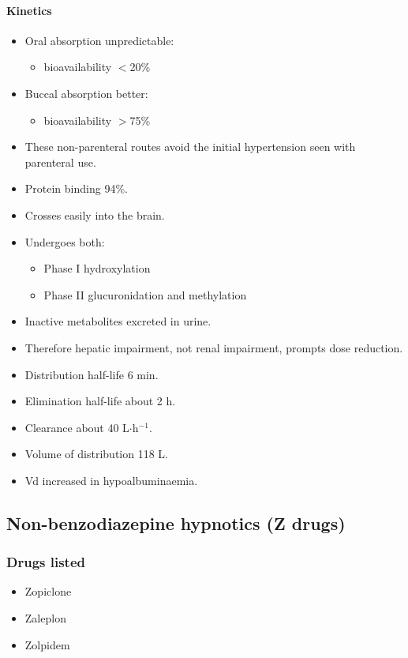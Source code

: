 \documentclass[11pt,a4paper]{article}
\begin{document}
\paragraph{Kinetics}
\begin{itemize}
  \item Oral absorption unpredictable:
  \begin{itemize}
    \item bioavailability $<$20\%
  \end{itemize}
  \item Buccal absorption better:
  \begin{itemize}
    \item bioavailability $>$75\%
  \end{itemize}
  \item These non-parenteral routes avoid the initial hypertension seen with parenteral use.
  \item Protein binding 94\%.
  \item Crosses easily into the brain.
  \item Undergoes both:
  \begin{itemize}
    \item Phase I hydroxylation
    \item Phase II glucuronidation and methylation
  \end{itemize}
  \item Inactive metabolites excreted in urine.
  \item Therefore hepatic impairment, not renal impairment, prompts dose reduction.
  \item Distribution half-life 6 min.
  \item Elimination half-life about 2 h.
  \item Clearance about 40 L$\cdot$h$^{-1}$.
  \item Volume of distribution 118 L.
  \item Vd increased in hypoalbuminaemia.
\end{itemize}

\subsection{Non-benzodiazepine hypnotics (Z drugs)}

\subsubsection{Drugs listed}
\begin{itemize}
  \item Zopiclone
  \item Zaleplon
  \item Zolpidem
\end{itemize}
\end{document}

